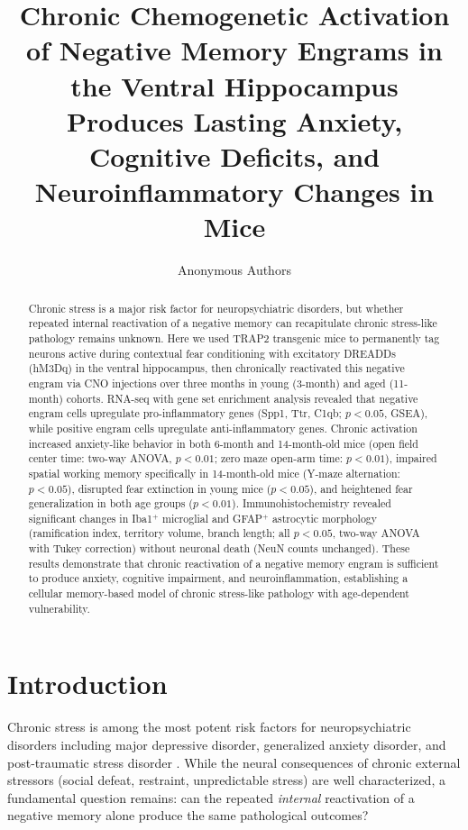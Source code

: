 \documentclass[11pt]{article}
\title{Chronic Chemogenetic Activation of Negative Memory Engrams in the Ventral Hippocampus Produces Lasting Anxiety, Cognitive Deficits, and Neuroinflammatory Changes in Mice}
\author{Anonymous Authors}
\date{}
\begin{document}
\maketitle

\begin{abstract}
Chronic stress is a major risk factor for neuropsychiatric disorders, but whether repeated internal reactivation of a negative memory can recapitulate chronic stress-like pathology remains unknown. Here we used TRAP2 transgenic mice to permanently tag neurons active during contextual fear conditioning with excitatory DREADDs (hM3Dq) in the ventral hippocampus, then chronically reactivated this negative engram via CNO injections over three months in young (3-month) and aged (11-month) cohorts. RNA-seq with gene set enrichment analysis revealed that negative engram cells upregulate pro-inflammatory genes (Spp1, Ttr, C1qb; $p < 0.05$, GSEA), while positive engram cells upregulate anti-inflammatory genes. Chronic activation increased anxiety-like behavior in both 6-month and 14-month-old mice (open field center time: two-way ANOVA, $p < 0.01$; zero maze open-arm time: $p < 0.01$), impaired spatial working memory specifically in 14-month-old mice (Y-maze alternation: $p < 0.05$), disrupted fear extinction in young mice ($p < 0.05$), and heightened fear generalization in both age groups ($p < 0.01$). Immunohistochemistry revealed significant changes in Iba1$^+$ microglial and GFAP$^+$ astrocytic morphology (ramification index, territory volume, branch length; all $p < 0.05$, two-way ANOVA with Tukey correction) without neuronal death (NeuN counts unchanged). These results demonstrate that chronic reactivation of a negative memory engram is sufficient to produce anxiety, cognitive impairment, and neuroinflammation, establishing a cellular memory-based model of chronic stress-like pathology with age-dependent vulnerability.
\end{abstract}

\section{Introduction}

Chronic stress is among the most potent risk factors for neuropsychiatric disorders including major depressive disorder, generalized anxiety disorder, and post-traumatic stress disorder \citep{kessler2005lifetime, mcewen2008central}. While the neural consequences of chronic external stressors (social defeat, restraint, unpredictable stress) are well characterized, a fundamental question remains: can the repeated \textit{internal} reactivation of a negative memory alone produce the same pathological outcomes?
\end{document}

